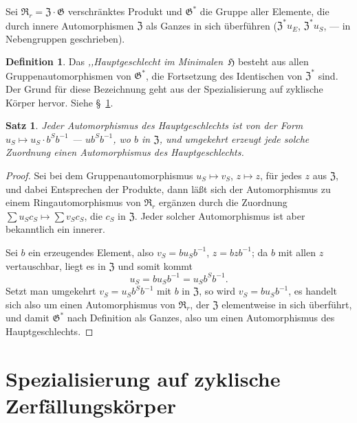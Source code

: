 \documentclass[12pt,a4paper]{article}
\theoremstyle{plain}
\newtheorem{satz}{Satz}[section]
\theoremstyle{definition}
\newtheorem{definition}{Definition}[section]
\theoremstyle{remark}
\begin{document}
Sei $\mathfrak{R}_{r} = \mathfrak{Z} \cdot \mathfrak{G}$ verschr\"anktes Produkt und
$\mathfrak{G}^{*}$ die Gruppe aller Elemente, die durch innere
Automorphismen $\mathfrak{Z}$ als Ganzes in sich \"uberf\"uhren ($\mathfrak{Z}^{*}u_{E}$,
$\mathfrak{Z}^{*}u_{S}$, --- in Nebengruppen geschrieben).

\begin{definition}
Das \textit{,,Hauptgeschlecht im Minimalen\grqq}\ $\mathfrak{H}$ besteht aus allen
Gruppenautomorphismen von $\mathfrak{G}^{*}$, die Fortsetzung des
Identischen von $\mathfrak{Z}^{*}$ sind. Der Grund f\"ur diese Bezeichnung
geht aus der Spezialisierung auf zyklische K\"orper hervor. Siehe
\S~\ref{sec:30}.
\end{definition}

\begin{satz}\label{satz:29-1}
Jeder Automorphismus des Hauptgeschlechts ist von der Form
$u_{S} \mapsto u_{S} \cdot b^{S}b^{-1}$ --- $ub^{S}b^{-1}$, wo $b$ in $\mathfrak{Z}$, und
umgekehrt erzeugt jede solche Zuordnung einen Automorphismus des
Hauptgeschlechts.
\end{satz}

\begin{proof}
Sei bei dem Gruppenautomorphismus $u_{S} \mapsto v_{S}$, $z \mapsto z$,
f\"ur jedes $z$ aus $\mathfrak{Z}$, und dabei Entsprechen der Produkte, dann
l\"a\ss t sich der Automorphismus zu einem Ringautomorphismus von
$\mathfrak{R}_{r}$ erg\"anzen durch die Zuordnung $\sum u_{S}c_{S} \mapsto \sum v_{S}c_{S}$,
die $c_{S}$ in $\mathfrak{Z}$. Jeder solcher Automorphismus ist aber bekanntlich
ein innerer.

Sei $b$ ein erzeugendes Element, also $v_{S} = bu_{S}b^{-1}$,
$z = bzb^{-1}$; da $b$ mit allen $z$ vertauschbar, liegt es in $\mathfrak{Z}$
und somit kommt
\[
u_{S} = bu_{S}b^{-1} = u_{S}b^{S}b^{-1}.
\]
Setzt man umgekehrt $v_{S} = u_{S}b^{S}b^{-1}$ mit $b$ in $\mathfrak{Z}$, so
wird $v_{S} = bu_{S}b^{-1}$, es handelt sich also um einen
Automorphismus von $\mathfrak{R}_{r}$, der $\mathfrak{Z}$ elementweise in sich
\"uberf\"uhrt, und damit $\mathfrak{G}^{*}$ nach Definition als Ganzes, also um
einen Automorphismus des Hauptgeschlechts.
\end{proof}

\newpage
\section{Spezialisierung auf zyklische Zerf\"allungsk\"orper}\label{sec:30}
\end{document}
